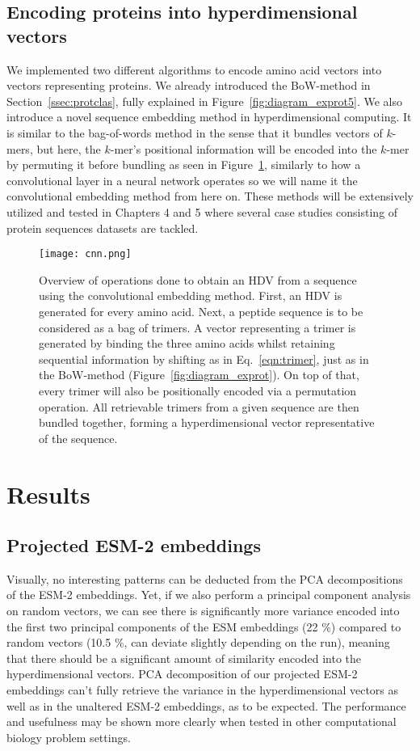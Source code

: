 \subsection{Encoding proteins into hyperdimensional vectors}\label{ssec:protseq}
We implemented two different algorithms to encode amino acid vectors into vectors representing proteins. We already introduced the BoW-method in Section~\ref{ssec:protclas}, fully explained in Figure~\ref{fig:diagram_exprot5}. We also introduce a novel sequence embedding method in hyperdimensional computing.  It is similar to the bag-of-words method in the sense that it bundles vectors of $k$-mers, but here, the $k$-mer's positional information will be encoded into the $k$-mer by permuting it before bundling as seen in Figure~\ref{fig:cnn}, similarly to how a convolutional layer in a neural network operates so we will name it the convolutional embedding method from here on. These methods will be extensively utilized and tested in Chapters 4 and 5 where several case studies consisting of protein sequences datasets are tackled.

\begin{figure}[ht!]
    \centering
    \texttt{[image: cnn.png]}
    \caption{Overview of operations done to obtain an HDV from a sequence using the convolutional embedding method. First, an HDV is generated for every amino acid. Next, a peptide sequence is to be considered as a bag of trimers. A vector representing a trimer is generated by binding the three amino acids whilst retaining sequential information by shifting as in Eq.~\ref{eqn:trimer}, just as in the BoW-method (Figure~\ref{fig:diagram_exprot}). On top of that, every trimer will also be positionally encoded via a permutation operation. All retrievable trimers from a given sequence are then bundled together, forming a hyperdimensional vector representative of the sequence.}\label{fig:cnn}
\end{figure}

\section{Results}
\subsection{Projected ESM-2 embeddings}
Visually, no interesting patterns can be deducted from the PCA decompositions of the ESM-2 embeddings. Yet, if we also perform a principal component analysis on random vectors, we can see there is significantly more variance encoded into the first two principal components of the ESM embeddings (22 \%) compared to random vectors (10.5 \%, can deviate slightly depending on the run), meaning that there should be a significant amount of similarity encoded into the hyperdimensional vectors. PCA decomposition of our projected ESM-2 embeddings can't fully retrieve the variance in the hyperdimensional vectors as well as in the unaltered ESM-2 embeddings, as to be expected. The performance and usefulness may be shown more clearly when tested in other computational biology problem settings.

